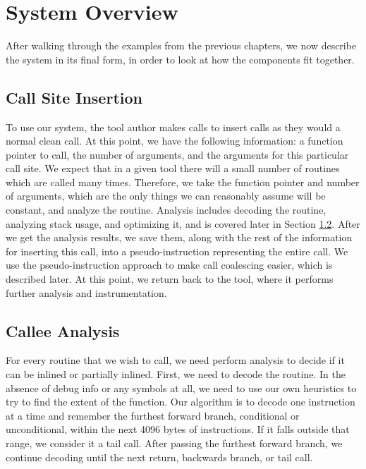 \chapter{System Overview}
\label{sec:system}

After walking through the examples from the previous chapters, we now describe
the system in its final form, in order to look at how the components fit
together.

\section{Call Site Insertion}

To use our system, the tool author makes calls to insert calls as they would a
normal clean call.  At this point, we have the following information: a function
pointer to call, the number of arguments, and the arguments for this particular
call site.  We expect that in a given tool there will a small number of routines
which are called many times.  Therefore, we take the function pointer and number
of arguments, which are the only things we can reasonably assume will be
constant, and analyze the routine.  Analysis includes decoding the routine,
analyzing stack usage, and optimizing it, and is covered later in Section
\ref{sec:callee}.  After we get the analysis results, we save them, along with
the rest of the information for inserting this call, into a pseudo-instruction
representing the entire call.  We use the pseudo-instruction approach to make
call coalescing easier, which is described later.  At this point, we return back
to the tool, where it performs further analysis and instrumentation.

\section{Callee Analysis}
\label{sec:callee}

For every routine that we wish to call, we need perform analysis to decide if it
can be inlined or partially inlined.  First, we need to decode the routine.  In
the absence of debug info or any symbols at all, we need to use our own
heuristics to try to find the extent of the function.  Our algorithm is to
decode one instruction at a time and remember the furthest forward branch,
conditional or unconditional, within the next 4096 bytes of instructions.  If it
falls outside that range, we consider it a tail call.  After passing the
furthest forward branch, we continue decoding until the next return, backwards
branch, or tail call.

